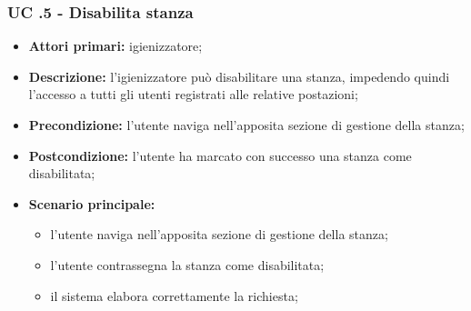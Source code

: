 \subsubsection{UC .5 - Disabilita stanza}

\begin{itemize}
\item \textbf{Attori primari:} igienizzatore;
\item \textbf{Descrizione:} l’igienizzatore può disabilitare una stanza, impedendo quindi l’accesso a tutti gli utenti registrati alle relative postazioni;
\item \textbf{Precondizione:} l'utente naviga nell’apposita sezione di gestione della stanza; 
\item \textbf{Postcondizione:} l'utente ha marcato con successo una stanza come disabilitata;
\item \textbf{Scenario principale:} 
	\begin{itemize}
		\item l’utente naviga nell’apposita sezione di gestione della stanza;	
		\item l'utente contrassegna la stanza come disabilitata;
		\item il sistema elabora correttamente la richiesta;
	\end{itemize}
\end{itemize}



